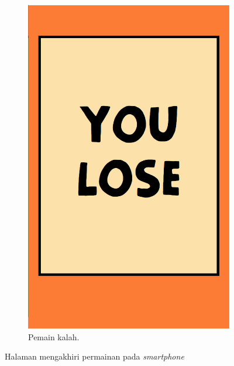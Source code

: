 \begin{enumerate}
\begin{figure}[H]
\begin{subfigure}{.5\textwidth}
			\includegraphics[scale=0.2]{Gambar/realPhone5_over3}
			\caption{Pemain kalah.}
			\label{subfig:realPhone5_over3}
		\end{subfigure}
		\caption{Halaman mengakhiri permainan pada \textit{smartphone}}
		\label{fig:realPhone5_over}
	\end{figure}
	

\end{enumerate}


